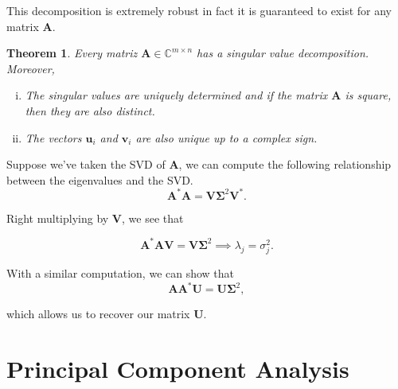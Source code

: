 \documentclass[12pt]{article}
\newcommand{\bbC}{\mathbb{C}}
\renewcommand{\vec}[1]{\mathbf{#1}}
\newtheorem{thm}{Theorem}[section]
\theoremstyle{definition}
\theoremstyle{remark}
\numberwithin{equation}{section}
\begin{document}
This decomposition is extremely robust in fact it is guaranteed to exist for any matrix $\vec{A}$.
\begin{thm}
  Every matriz $\vec{A} \in \bbC^{m\times n}$ has a singular value decomposition. Moreover,
  \begin{enumerate}[(i)]
    \item The singular values are uniquely determined and if the matrix $\vec{A}$ is square, then they are also distinct.
    \item The vectors $\vec{u}_i$ and $\vec{v}_i$ are also unique up to a complex sign.
  \end{enumerate}
\end{thm}

Suppose we've taken the SVD of $\vec{A}$, we can compute the following relationship between the eigenvalues and the SVD.
\begin{equation}
  \vec{A}^*\vec{A} = \vec{V}\vec{\Sigma}^2\vec{V}^*.
\end{equation}

Right multiplying by $\vec{V}$, we see that 

\begin{equation}
  \vec{A}^*\vec{A} \vec{V} = \vec{V}\vec{\Sigma}^2 \implies \lambda_j = \sigma_j^2.
\end{equation}

With a similar computation, we can show that
\begin{equation}
  \vec{A}\vec{A}^* \vec{U} = \vec{U} \vec{\Sigma}^2,
\end{equation}

which allows us to recover our matrix $\vec{U}$.

\section{Principal Component Analysis}%
\label{sec:principal_component_analysis}



\end{document}

